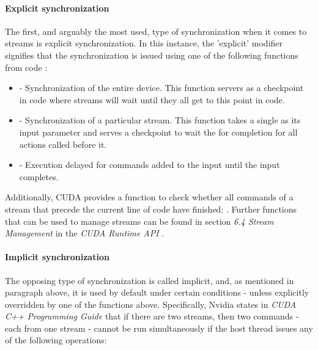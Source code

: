 \paragraph{Explicit synchronization}\label{Paragraph:CUDA-asynchronous-concurrent-execution-streams-explicit-synchronization}
The first, and arguably the most used, type of synchronization when it comes to streams is explicit synchronization. In this instance, the 'explicit' modifier signifies that the synchronization is issued using one of the following functions from code \cite{NVIDIAMay2022, NvidiaJanuary2022}:
\begin{itemize}
	\item {} - Synchronization of the entire device. This function servers as a checkpoint in code where streams will wait until they all get to this point in code.
	\item {} - Synchronization of a particular stream. This function takes a single  as its input parameter and serves a checkpoint to wait the for completion for all actions called before it.
	\item {} - Execution delayed for commands added to the input  until the input  completes.
\end{itemize}

Additionally, CUDA provides a function to check whether all commands of a stream that precede the current line of code have finished: . Further functions that can be used to manage streams can be found in section \emph{6.4 Stream Management} in the \emph{CUDA Runtime API} \cite{NvidiaJanuary2022}.

\paragraph{Implicit synchronization}\label{Paragraph:CUDA-asynchronous-concurrent-execution-streams-implicit-synchronization}
The opposing type of synchronization is called implicit, and, as mentioned in paragraph \textit{} above, it is used by default under certain conditions - unless explicitly overridden by one of the functions above. Specifically, Nvidia states in \emph{CUDA C++ Programming Guide} \cite{NVIDIAMay2022} that if there are two streams, then two commands - each from one stream - cannot be run simultaneously if the host thread issues any of the following operations:

